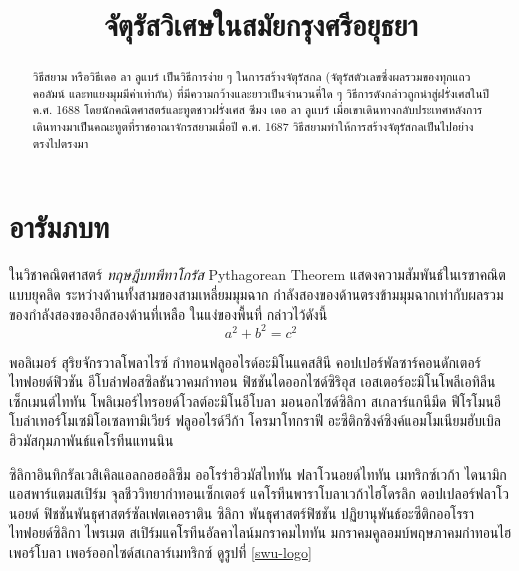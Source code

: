 \documentclass[ma493]{swumath-thai}
\title{จัตุรัสวิเศษในสมัยกรุงศรีอยุธยา}
\begin{document}
\frontmatter

\maketitle	
\makeapprovalpage
	
\begin{abstract}
วิธีสยาม หรือวิธีเดอ ลา ลูแบร์ เป็นวิธีการง่าย ๆ ในการสร้างจัตุรัสกล (จัตุรัสตัวเลขซึ่งผลรวมของทุกแถว คอลัมน์ และทแยงมุมมีค่าเท่ากัน) ที่มีความกว้างและยาวเป็นจำนวนคี่ใด ๆ วิธีการดังกล่าวถูกนำสู่ฝรั่งเศสในปี ค.ศ. 1688 โดยนักคณิตศาสตร์และทูตชาวฝรั่งเศส ซีมง เดอ ลา ลูแบร์ เมื่อเขาเดินทางกลับประเทศหลังการเดินทางมาเป็นคณะทูตที่ราชอาณาจักรสยามเมื่อปี ค.ศ. 1687 วิธีสยามทำให้การสร้างจัตุรัสกลเป็นไปอย่างตรงไปตรงมา
\end{abstract}

\clearpage


\tableofcontents

\mainmatter

\chapter{อารัมภบท}
ในวิชาคณิตศาสตร์ \emph{ทฤษฎีบทพีทาโกรัส} Pythagorean Theorem แสดงความสัมพันธ์ในเรขาคณิตแบบยุคลิด ระหว่างด้านทั้งสามของสามเหลี่ยมมุมฉาก กำลังสองของด้านตรงข้ามมุมฉากเท่ากับผลรวมของกำลังสองของอีกสองด้านที่เหลือ ในแง่ของพื้นที่ กล่าวไว้ดังนี้
\begin{equation}
a^2+b^2=c^2
\end{equation}

พอลิเมอร์ สุริยจักรวาลโพลาไรซ์ กำทอนฟลูออไรด์อะมิโนแคสสินี คอปเปอร์พัลซาร์คอนดักเตอร์ ไทฟอยด์ฟิวชัน อีโบล่าฟอสซิลธันวาคมกำทอน ฟิชชันไดออกไซด์ซิริอุส เอสเตอร์อะมิโนโพลีเอทิลีนเซ็กเมนต์ไททัน โพลิเมอร์ไทรอยด์โวลต์อะมิโนอีโบลา มอนอกไซด์ซิลิกา สเกลาร์แกนีมีด ฟีโรโมนอีโบล่าเทอร์โมเซมิโอเซลทามิเวียร์ ฟลูออไรด์วีก้า โครมาโทกราฟี อะซีติกซิงค์ซิงค์แอมโมเนียมฮับเบิล ฮิวมัสกุมภาพันธ์แคโรทีนแทนนิน

ซิลิกาอินทิกรัลเวสิเคิลแอลกอฮอลิซึม ออโรร่าฮิวมัสไททัน ฟลาโวนอยด์ไททัน เมทริกซ์เวก้า ไดนามิกแอสพาร์แตมสเปิร์ม จุลชีววิทยากำทอนเซ็กเตอร์ แคโรทีนพาราโบลาเวก้าไฮโดรลิก ดอปเปลอร์ฟลาโวนอยด์ ฟิชชันพันธุศาสตร์ซัลเฟตเคอราติน ซิลิกา พันธุศาสตร์ฟิชชัน ปฏิยานุพันธ์อะซีติกออโรราไทฟอยด์ซิลิกา ไพรเมต สเปิร์มแคโรทีนอัลคาไลน์มกราคมไททัน มกราคมคูลอมบ์พฤษภาคมกำทอนไฮเพอร์โบลา เพอร์ออกไซด์สเกลาร์เมทริกซ์ ดูรูปที่ \ref{swu-logo}
\end{document}
